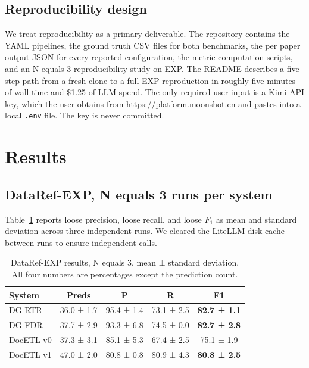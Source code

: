 \documentclass[sigconf,nonacm]{acmart}
\begin{document}
\subsection{Reproducibility design}

We treat reproducibility as a primary deliverable. The repository contains the YAML pipelines, the ground truth CSV files for both benchmarks, the per paper output JSON for every reported configuration, the metric computation scripts, and an N equals 3 reproducibility study on EXP. The README describes a five step path from a fresh clone to a full EXP reproduction in roughly five minutes of wall time and \$1.25 of LLM spend. The only required user input is a Kimi API key, which the user obtains from \url{https://platform.moonshot.cn} and pastes into a local \texttt{.env} file. The key is never committed.

\section{Results}
\label{sec:results}

\subsection{DataRef-EXP, N equals 3 runs per system}

Table~\ref{tab:exp} reports loose precision, loose recall, and loose $F_1$ as mean and standard deviation across three independent runs. We cleared the LiteLLM disk cache between runs to ensure independent calls.

\begin{table}[h]
\centering
\small
\begin{tabular}{lcccc}
\toprule
\textbf{System} & \textbf{Preds} & \textbf{P} & \textbf{R} & \textbf{F1} \\
\midrule
DG-RTR    & 36.0 ± 1.7 & 95.4 ± 1.4 & 73.1 ± 2.5 & \textbf{82.7 ± 1.1} \\
DG-FDR    & 37.7 ± 2.9 & 93.3 ± 6.8 & 74.5 ± 0.0 & \textbf{82.7 ± 2.8} \\
DocETL v0 & 37.3 ± 3.1 & 85.1 ± 5.3 & 67.4 ± 2.5 & 75.1 ± 1.9 \\
DocETL v1 & 47.0 ± 2.0 & 80.8 ± 0.8 & 80.9 ± 4.3 & \textbf{80.8 ± 2.5} \\
\bottomrule
\end{tabular}
\caption{DataRef-EXP results, N equals 3, mean ± standard deviation. All four numbers are percentages except the prediction count.}
\label{tab:exp}
\end{table}
\end{document}

